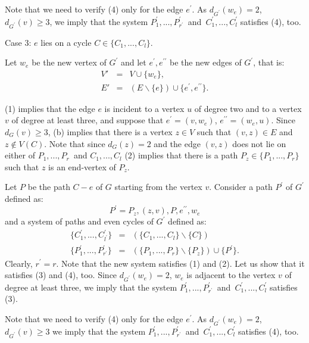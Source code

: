 \documentclass[fleqn,12pt,twoside]{article}
\newenvironment{proof}[1][Proof.]{\begin{trivlist}
\item[\hskip \labelsep {\bfseries #1}]}{\end{trivlist}}
\begin{document}
\begin{proof}
Note that we need to verify (4) only for the edge $e^{\prime }$. As $d_{G^{\prime }}(w_{e})=2$, $d_{G^{\prime }}(v)\geq 3$, we imply that
the
system $P_{1}^{\prime },...,P_{r^{\prime }}^{\prime }$\textit{\ }and\textit{\ }$C_{1}^{\prime },...,C_{l}^{\prime }$ satisfies (4), too.

Case 3: $e$ lies on a cycle $C\in \{C_{1},...,C_{l}\}$.

Let $w_{e}$ be the new vertex of $G^{\prime }$ and let $e^{\prime
},e^{\prime \prime }$ be the new edges of $G^{\prime }$, that is:
\begin{eqnarray*}
V' &=&V\cup \{w_{e}\}, \\
E' &=&(E\backslash \{e\})\cup \{e^{\prime },e^{\prime \prime }\}.
\end{eqnarray*}

(1) implies that the edge $e$ is incident to a vertex $u$ of degree
two and to a vertex $v$ of degree at least three, and suppose that
$e^{\prime }=(v,w_{e})$, $e^{\prime \prime }=(w_{e},u)$. Since
$d_{G}(v)\geq 3$, (b)
implies that there is a vertex $z\in V$ such that $(v,z)\in E$ and $z\notin V(C)$. Note that since $d_{G}(z)=2$ and the edge $(v,z)$
does not lie on either of $P_{1},...,P_{r}$\textit{\ }and
$C_{1},...,C_{l}$ (2) implies that there is a path $P_{z}\in
\{P_{1},...,P_{r}\}$ such that $z$ is an end-vertex of $P_{z}$.

Let $P$ be the path $C-e$ of $G$ starting from the vertex $v$.
Consider a path $P^{\prime }$ of $G^{\prime }$ defined as:
\begin{equation*}
P^{\prime }=P_{z},(z,v),P,e^{\prime \prime },w_{e}
\end{equation*}and a system of paths and even cycles of $G^{\prime }$ defined as:
\begin{eqnarray*}
\{C_{1}^{\prime },...,C_{l^{\prime }}^{\prime }\}
&=&(\{C_{1},...,C_{l}\}\backslash \{C\}) \\
\{P_{1}^{\prime },...,P_{r^{\prime }}^{\prime }\}
&=&(\{P_{1},...,P_{r}\}\backslash \{P_{z}\})\cup \{P^{\prime }\}.
\end{eqnarray*}Clearly, $r^{\prime }=r$. Note that the new system satisfies (1) and
(2). Let us show that it satisfies (3) and (4), too. Since
$d_{G^{\prime }}(w_{e})=2$, $w_{e}$ is adjacent to the vertex $v$ of
degree at least three, we imply that the system $P_{1}^{\prime
},...,P_{r^{\prime }}^{\prime }$\textit{\ }and\textit{\
}$C_{1}^{\prime },...,C_{l}^{\prime }$ satisfies (3).

Note that we need to verify (4) only for the edge $e^{\prime }$. As $d_{G^{\prime }}(w_{e})=2$, $d_{G^{\prime }}(v)\geq 3$ we imply that
the
system $P_{1}^{\prime },...,P_{r^{\prime }}^{\prime }$\textit{\ }and\textit{\ }$C_{1}^{\prime },...,C_{l}^{\prime }$ satisfies (4), too.


\end{proof}
\end{document}
